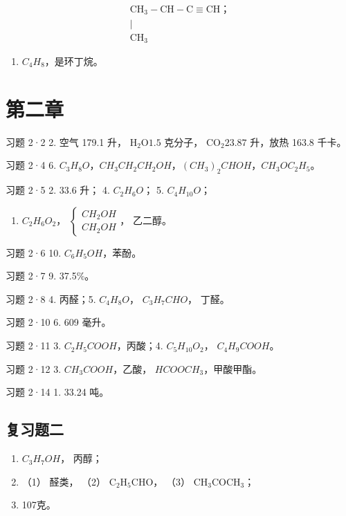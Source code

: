 \[
\begin{array}{c} \mathrm{CH} _ {3} - \mathrm{CH} - \mathrm{C} \equiv \mathrm{CH}\text{；} \\ | \\ \mathrm{CH} _ {3} \end{array}
\]

\begin{enumerate}[start=10]
\item
  \(C_{4}H_{8}\)，是环丁烷。
\end{enumerate}

\section{第二章}

习题 2·2 2. 空气 179.1 升， \({\mathrm{H}}_{2}\mathrm{O}{1.5}\) 克分子，
\({\mathrm{{CO}}}_{2}{23.87}\) 升，放热 163.8 千卡。

习题 2·4 6.
\(C_{3}H_{8}O\)，\(CH_{3}CH_{2}CH_{2}OH\)，\((CH_{3})_{2}CHOH\)，\(CH_{3}OC_{2}H_{5}\)。

习题 2·5 2. 33.6 升； 4. \(C_{2}H_{6}O\)； 5. \(C_{4}H_{10}O\)；

\begin{enumerate}[start=6]
\item
  \(C_{2}H_{6}O_{2}\)，
  \(\left\{\begin{array}{l}CH_{2}OH\\CH_{2}OH\end{array}\right.\)，
  乙二醇。
\end{enumerate}

习题 2·6 10. \(C_{6}H_{5}OH\)，苯酚。

习题 2·7 9. 37.5\%。

习题 2·8 4. 丙醛；5. \(C_{4}H_{8}O\)， \(C_{3}H_{7}CHO\)， 丁醛。

习题 2·10 6. 609 毫升。

习题 2·11 3. \(C_{2}H_{5}COOH\)，丙酸；4. \(C_{5}H_{10}O_{2}\)，
\(C_{4}H_{9}COOH\)。

习题 2·12 3. \(CH_{3}COOH\)，乙酸， \(HCOOCH_{3}\)，甲酸甲酯。

习题 2·14 1. 33.24 吨。

\subsection{复习题二}

\begin{enumerate}[start=6]
\item
  \(C_{3}H_{7}OH\)， 丙醇；
\item
  （1） 醛类， （2） \(\mathrm{C}_{2} \mathrm{H}_{5} \mathrm{CHO}\)，
  （3） \(\mathrm{CH}_{3} \mathrm{COCH}_{3}\)；
\item
  107克。
\end{enumerate}

